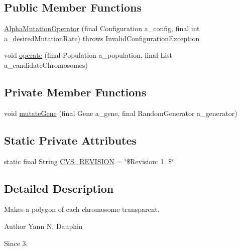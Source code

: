 \subsection*{Public Member Functions}
\begin{DoxyCompactItemize}
\item 
\hyperlink{classexamples_1_1monalisa_1_1core_1_1_alpha_mutation_operator_aabc6d385d9ef989ff67222b6eac6fd94}{Alpha\-Mutation\-Operator} (final Configuration a\-\_\-config, final int a\-\_\-desired\-Mutation\-Rate)  throws Invalid\-Configuration\-Exception 
\item 
void \hyperlink{classexamples_1_1monalisa_1_1core_1_1_alpha_mutation_operator_ae1fcb87d1d1a9d22a86b7f4bb5593c60}{operate} (final Population a\-\_\-population, final List a\-\_\-candidate\-Chromosomes)
\end{DoxyCompactItemize}
\subsection*{Private Member Functions}
\begin{DoxyCompactItemize}
\item 
void \hyperlink{classexamples_1_1monalisa_1_1core_1_1_alpha_mutation_operator_a6369d804d17783cffefe55b418dc8ec5}{mutate\-Gene} (final Gene a\-\_\-gene, final Random\-Generator a\-\_\-generator)
\end{DoxyCompactItemize}
\subsection*{Static Private Attributes}
\begin{DoxyCompactItemize}
\item 
static final String \hyperlink{classexamples_1_1monalisa_1_1core_1_1_alpha_mutation_operator_a4d6391bbaf0400e4f4cc1075744b2711}{C\-V\-S\-\_\-\-R\-E\-V\-I\-S\-I\-O\-N} = \char`\"{}\$Revision\-: 1. \$\char`\"{}
\end{DoxyCompactItemize}


\subsection{Detailed Description}
Makes a polygon of each chromosome transparent.

\begin{DoxyAuthor}{Author}
Yann N. Dauphin 
\end{DoxyAuthor}
\begin{DoxySince}{Since}
3. 
\end{DoxySince}


